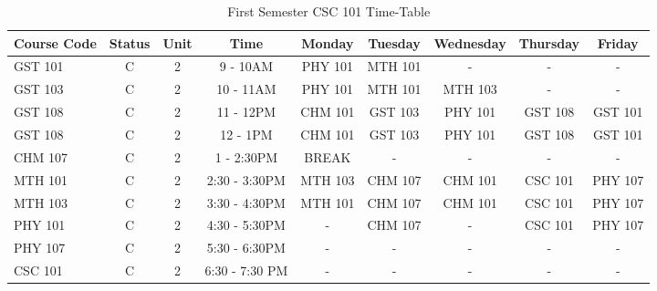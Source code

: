 \documentclass{article}
\begin{document}
\begin{sidewaystable}[h!]
	\begin{center}
		\caption{First Semester CSC 101 Time-Table}
		
		\label{tab:table1}
		
		\begin{tabular}{l|c|c|c|c|c|c|c|c}
			\cellcolor{blue!16}\textbf{Course Code} & \cellcolor{blue!16}\textbf{Status} & \cellcolor{blue!16}\textbf{Unit} & \cellcolor{blue!16}\textbf{Time} & \cellcolor{orange!16}\textbf{Monday} & \cellcolor{green!16}\textbf{Tuesday} & \cellcolor{yellow!16}\textbf{Wednesday} & \cellcolor{purple!16}\textbf{Thursday} & \cellcolor{brown!16}\textbf{Friday}\\
			\hline
			
			\cellcolor{pink!46}GST 101 & C & 2 & 9 - 10AM & PHY 101 & MTH 101 & - & - & - \\
			
			\cellcolor{blue!16}GST 103 & C & 2 & 10 - 11AM & PHY 101 & MTH 101 & MTH 103 & - & - \\
			
			\cellcolor{red!16}GST 108 & C & 2 & 11 - 12PM & CHM 101 & GST 103 & PHY 101 & GST 108 & GST 101 \\
			
			\cellcolor{olive!16}GST 108 & C & 2 & 12 - 1PM & CHM 101 & GST 103 & PHY 101 & GST 108 & GST 101 \\
			
			\cellcolor{teal!16}CHM 107 & C & 2 & 1 - 2:30PM & \cellcolor{gray!16}BREAK & \cellcolor{gray!16}- & \cellcolor{gray!16}- & \cellcolor{gray!16}- & \cellcolor{gray!16}- \\
			
			\cellcolor{violet!16}MTH 101 & C & 2 & 2:30 - 3:30PM & MTH 103 & CHM 107 & CHM 101 & CSC 101 & PHY 107 \\
			
			\cellcolor{yellow!16}MTH 103 & C & 2 & 3:30 - 4:30PM & MTH 101 & CHM 107 & CHM 101 & CSC 101 & PHY 107 \\
			
			\cellcolor{cyan!16}PHY 101 & C & 2 & 4:30 - 5:30PM & - & CHM 107 & - & CSC 101 & PHY 107 \\
			
			\cellcolor{red!16}PHY 107 & C & 2 & 5:30 - 6:30PM & - & - & - & - & - \\
			
			\cellcolor{magenta!20}CSC 101 & C & 2 & 6:30 - 7:30 PM & - & - & - & - & - \\
		\end{tabular}
	\end{center}
\end{sidewaystable}
\end{document}

